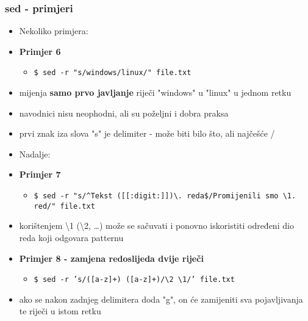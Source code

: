 \documentclass[table,usenames,dvipsnames]{beamer}
\newcommand{\shell}[1]{\texttt{#1}}
\begin{document}
\begin{frame}
\frametitle{sed - primjeri}
	\begin{itemize}
	    \item Nekoliko primjera:
		\item \textbf{Primjer 6}
		\begin{itemize}
			\item \small \shell{\$ sed -r "s/windows/linux/" file.txt}
		\end{itemize}

		\item mijenja \textbf{samo prvo javljanje} riječi "windows" u "linux" u jednom retku
		\item navodnici nisu neophodni, ali su poželjni i dobra praksa
		\item prvi znak iza slova "s" je delimiter - može biti bilo što, ali najčešće /
	\end{itemize}
\end{frame}


\begin{frame}
    \begin{itemize}
    	\item Nadalje:
		\item \textbf{Primjer 7}
		\begin{itemize}
			\item \small \shell{\$ sed -r "s/\textasciicircum Tekst ([[:digit:]])\textbackslash. reda\$/Promijenili 
			smo \textbackslash1. red/" file.txt}
		\end{itemize}

		\item korištenjem \textbackslash1 (\textbackslash2, \dots) može se sačuvati i ponovno iskoristiti određeni dio reda koji odgovara patternu
		\vfill

		\item \textbf{Primjer 8 - zamjena redoslijeda dvije riječi}
		\begin{itemize}
			\item \small \shell{\$ sed -r 's/([a-z]+) ([a-z]+)/\textbackslash2 \textbackslash1/' file.txt}
		\end{itemize}

		\item ako se nakon zadnjeg delimitera doda "g", on će zamijeniti sva pojavljivanja te riječi u istom retku
	\end{itemize}
\end{frame}
\end{document}
